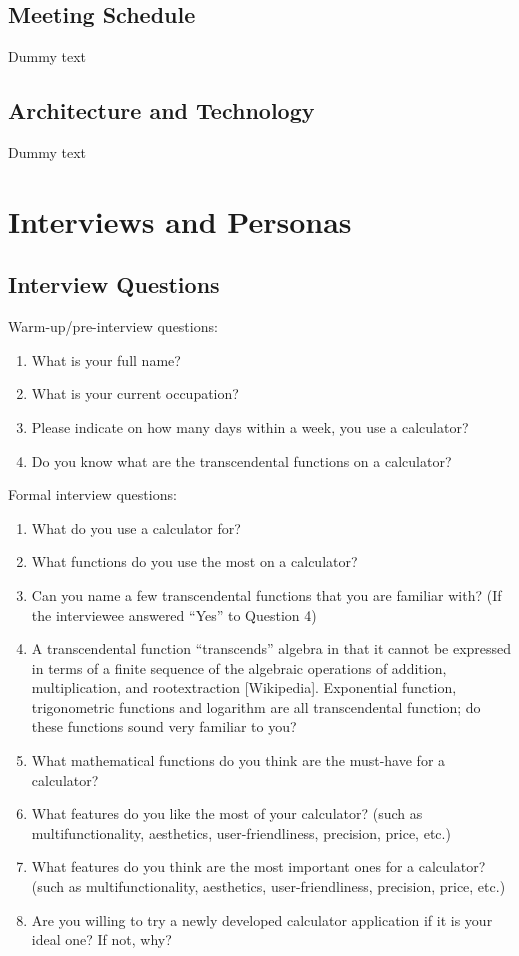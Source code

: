 \documentclass[12pt]{article}
\begin{document}
\subsection{Meeting Schedule}
Dummy text


\subsection{Architecture and Technology}
Dummy text

\newpage
\section{Interviews and Personas}

\subsection{Interview Questions}
Warm-up/pre-interview questions:
\begin{enumerate}
\item What is your full name?
\item What is your current occupation?
\item Please indicate on how many days within a week, you use a calculator?
\item Do you know what are the transcendental functions on a calculator?
\end{enumerate}
Formal interview questions:
\begin{enumerate}
\item What do you use a calculator for?
\item What functions do you use the most on a calculator?
\item Can you name a few transcendental functions that you are familiar with?\newline
      (If the interviewee answered “Yes” to Question 4)
\item A transcendental function “transcends” algebra in that it cannot be expressed in terms\newline
      of a finite sequence of the algebraic operations of addition, multiplication, and root\newline extraction [Wikipedia]. Exponential function, trigonometric functions and logarithm are all transcendental function; do these functions sound very familiar to you?
\item What mathematical functions do you think are the must-have for a calculator?
\item What features do you like the most of your calculator?\newline
      (such as multifunctionality, aesthetics, user-friendliness, precision, price, etc.)
\item What features do you think are the most important ones for a calculator?\newline
      (such as multifunctionality, aesthetics, user-friendliness, precision, price, etc.)

\item Are you willing to try a newly developed calculator application if it is your ideal one?\newlineIf
      If not, why?
\end{enumerate}
\end{document}
